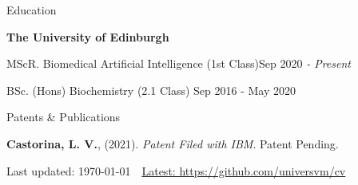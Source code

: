 \documentclass{resume} %
\begin{document}

\begin{rSection}{Education}

\begin{rSubsection}{\bf The University of Edinburgh} \hfill {\em} \\ 
\item MScR. Biomedical Artificial Intelligence (1st Class)\hfill {Sep 2020
\em - Present}
\item BSc. (Hons) Biochemistry (2.1 Class) \hfill {Sep 2016 - May 2020}
\end{rSubsection}
\end{rSection}

\begin{rSection}{Patents \& Publications}

\textbf{Castorina, L. V.}, (2021). \textit{Patent Filed with IBM}. Patent Pending.

\end{rSection}




\fontsize{8pt}{12pt}\selectfont
\begin{flushright}
Last updated: \today \ \  \href{https://github.com/universvm/cv}{Latest: https://github.com/universvm/cv}
\end{flushright}
\end{document}
